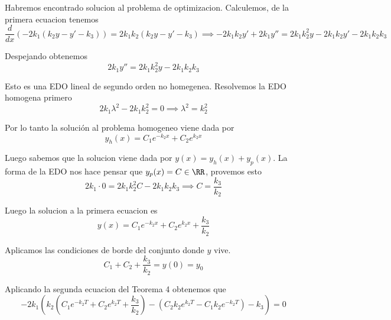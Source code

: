 \documentclass[a4paper,oneside,10.5pt]{USMArt}
\begin{document}
\begin{sol}
\begin{enumerate}
        Habremos encontrado solucion al problema de optimizacion. Calculemos, de la primera ecuacion tenemos
        \begin{equation*}
          \frac{d}{dx}(-2k_{1}(k_{2}y - y' - k_{3})) = 2k_{1}k_{2}(k_{2}y - y' -k_{3}) \implies -2k_{1}k_{2}y' + 2k_{1}y'' = 2k_{1}k_{2}^{2}y - 2k_{1}k_{2}y' - 2k_{1}k_{2}k_{3}
        \end{equation*}

        Despejando obtenemos
        \begin{equation*}
          2k_{1}y'' = 2k_{1}k_{2}^{2}y - 2k_{1}k_{2}k_{3}
        \end{equation*}

        Esto es una EDO lineal de segundo orden no homegenea. Resolvemos la EDO homogena primero
        \begin{equation*}
          2k_{1} \lambda^{2} - 2k_{1}k_{2}^{2} = 0 \implies \lambda^{2} = k_{2}^{2}
        \end{equation*}

        Por lo tanto la soluci\'on al problema homogeneo viene dada por
        \begin{equation*}
          y_{h}(x) = C_{1}e^{-k_{2}x} + C_{2}e^{k_{2}x}
        \end{equation*}

        Luego sabemos que la solucion viene dada por $y(x) = y_{h}(x) + y_{p}(x)$. La forma de la EDO nos hace
        pensar que $y_{p}(x) = C \in \RR$, provemos esto
        \begin{equation*}
          2k_{1}\cdot 0 = 2k_{1}k_{2}^{2}C - 2k_{1}k_{2}k_{3} \implies C = \frac{k_{3}}{k_{2}}
        \end{equation*}

        Luego la solucion a la primera ecuacion es
        \begin{equation*}
          y(x) = C_{1}e^{-k_{2}x} + C_{2}e^{k_{2}x} + \frac{k_{3}}{k_{2}}
        \end{equation*}

        Aplicamos las condiciones de borde del conjunto donde $y$ vive.
        \begin{equation*}
          C_{1} + C_{2} + \frac{k_{3}}{k_{2}}= y(0) = y_{0}
        \end{equation*}

        Aplicando la segunda ecuacion del Teorema 4 obtenemos que
        \begin{equation*}
          -2k_{1}(k_{2}(C_{1}e^{-k_{2}T} + C_{2}e^{k_{2}T} + \frac{k_{3}}{k_{2}}) - (C_{2}k_{2}e^{k_{2}T} - C_{1}k_{2}e^{-k_{2}T}) - k_{3}) = 0
        \end{equation*}


\end{enumerate}
\end{sol}
\end{document}
